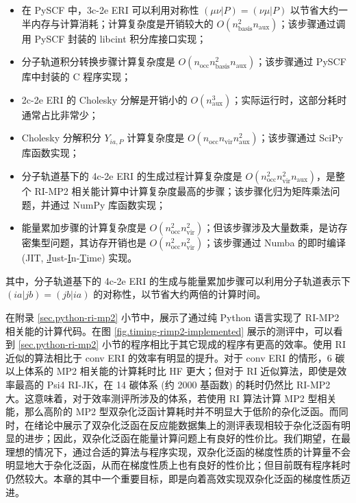 \begin{itemize}[nosep]
  \item 在 PySCF 中，3c-2e ERI 可以利用对称性 $(\mu \nu | P) = (\nu \mu | P)$ 以节省大约一半内存与计算消耗；计算复杂度是开销较大的 $O(n_\mathrm{basis}^2 n_\mathrm{aux})$；该步骤通过调用 PySCF 封装的 libcint 积分库接口实现；
  \item 分子轨道积分转换步骤计算复杂度是 $O(n_\mathrm{occ} n_\mathrm{basis}^2 n_\mathrm{aux})$；该步骤通过 PySCF 库中封装的 C 程序实现；
  \item 2c-2e ERI 的 Cholesky 分解是开销小的 $O(n_\mathrm{aux}^3)$；实际运行时，这部分耗时通常占比非常少；
  \item Cholesky 分解积分 $Y_{ia, P}$ 计算复杂度是 $O(n_\mathrm{occ} n_\mathrm{vir} n_\mathrm{aux}^2)$；该步骤通过 SciPy 库函数实现；
  \item 分子轨道基下的 4c-2e ERI 的生成过程计算复杂度是 $O(n_\mathrm{occ}^2 n_\mathrm{vir}^2 n_\mathrm{aux})$，是整个 RI-MP2 相关能计算中计算复杂度最高的步骤；该步骤化归为矩阵乘法问题，并通过 NumPy 库函数实现；
  \item 能量累加步骤的计算复杂度是 $O(n_\mathrm{occ}^2 n_\mathrm{vir}^2)$；但该步骤涉及大量数乘，是访存密集型问题，其访存开销也是 $O(n_\mathrm{occ}^2 n_\mathrm{vir}^2)$；该步骤通过 Numba 的即时编译 (JIT, \underline{J}ust-\underline{I}n-\underline{T}ime) 实现。
\end{itemize}
其中，分子轨道基下的 4c-2e ERI 的生成与能量累加步骤可以利用分子轨道表示下 $(ia|jb) = (jb|ia)$ 的对称性，以节省大约两倍的计算时间。

在附录 \ref{sec.python-ri-mp2} 小节中，展示了通过纯 Python 语言实现了 RI-MP2 相关能的计算代码。在图 \ref{fig.timing-rimp2-implemented} 展示的测评中，可以看到 \ref{sec.python-ri-mp2} 小节的程序相比于其它现成的程序有更高的效率。使用 RI 近似的算法相比于 conv ERI 的效率有明显的提升。对于 conv ERI 的情形，6 碳以上体系的 MP2 相关能的计算耗时比 HF 更大；但对于 RI 近似算法，即使是效率最高的 Psi4 RI-JK，在 14 碳体系 (约 2000 基函数) 的耗时仍然比 RI-MP2 大。这意味着，对于效率测评所涉及的体系，若使用 RI 算法计算 MP2 型相关能，那么高阶的 MP2 型双杂化泛函计算耗时并不明显大于低阶的杂化泛函。而同时，\alert{在绪论中}展示了双杂化泛函在反应能数据集上的测评表现相较于杂化泛函有明显的进步；因此，双杂化泛函在能量计算问题上有良好的性价比。我们期望，在最理想的情况下，通过合适的算法与程序实现，双杂化泛函的梯度性质的计算量不会明显地大于杂化泛函，从而在梯度性质上也有良好的性价比；但目前既有程序耗时仍然较大。本章的其中一个重要目标，即是向着高效实现双杂化泛函的梯度性质迈进。

